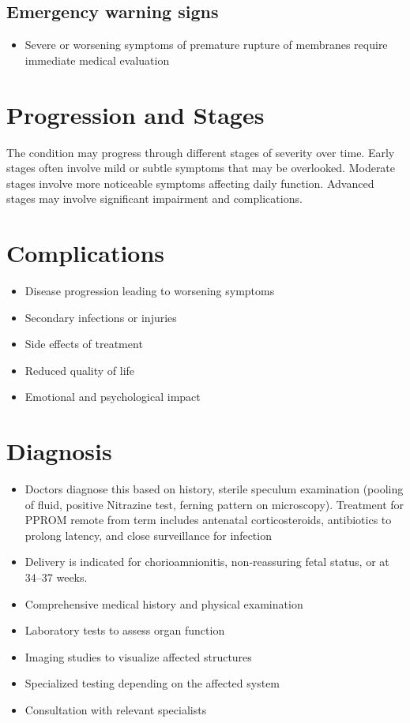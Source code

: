 \subsection{Emergency warning signs}
\begin{itemize}[noitemsep]
  \item Severe or worsening symptoms of premature rupture of membranes require immediate medical evaluation
\end{itemize}
\section{Progression and Stages}
The condition may progress through different stages of severity over time. Early stages often involve mild or subtle symptoms that may be overlooked. Moderate stages involve more noticeable symptoms affecting daily function. Advanced stages may involve significant impairment and complications.
\section{Complications}
\begin{itemize}[noitemsep]
  \item Disease progression leading to worsening symptoms
  \item Secondary infections or injuries
  \item Side effects of treatment
  \item Reduced quality of life
  \item Emotional and psychological impact
\end{itemize}
\section{Diagnosis}
\begin{itemize}[noitemsep]
  \item Doctors diagnose this based on history, sterile speculum examination (pooling of fluid, positive Nitrazine test, ferning pattern on microscopy). Treatment for PPROM remote from term includes antenatal corticosteroids, antibiotics to prolong latency, and close surveillance for infection
  \item Delivery is indicated for chorioamnionitis, non-reassuring fetal status, or at 34--37 weeks.
  \item Comprehensive medical history and physical examination
  \item Laboratory tests to assess organ function
  \item Imaging studies to visualize affected structures
  \item Specialized testing depending on the affected system
  \item Consultation with relevant specialists
\end{itemize}
